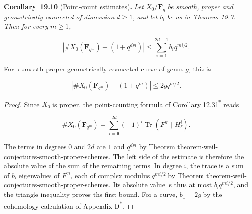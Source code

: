 \documentclass[11pt]{article}
\newenvironment{bpstatement}[2]{\par\addvspace{0.6\baselineskip}\noindent\textbf{#1}#2\textbf{.}\enspace\ignorespaces}
  {\par\addvspace{0.4\baselineskip}}
\newenvironment{bpstatementit}[2]{\begin{bpstatement}{#1}{#2}\itshape\ignorespaces}{\end{bpstatement}}
\newcommand{\bpout}[1]{#1\textsuperscript{\hyperlink{bp-outside}{\ensuremath{\ast}}}}
\begin{document}
\label{bp30}%
\begin{bpstatementit}{Corollary~19.10}{ (Point-count estimates)}
Let \(X_0/\mathbf F_q\) be smooth, proper and geometrically connected of dimension \(d\geq1\), and let \(b_i\) be as in Theorem \hyperref[bp24]{19.7}. Then for every \(m\geq1\),

\[
\left|\#X_0(\mathbf F_{q^m})-(1+q^{dm})\right|
\leq\sum_{i=1}^{2d-1}b_iq^{mi/2}.
\]

For a smooth proper geometrically connected curve of genus \(g\), this is

\[
\left|\#X_0(\mathbf F_{q^m})-(1+q^m)\right|
\leq 2gq^{m/2}.
\]
\end{bpstatementit}

\begin{proof}[{Proof}]\label{bp31}%
Since \(X_0\) is proper, the point-counting formula of Corollary \bpout{12.31} reads

\[
\#X_0(\mathbf F_{q^m})
=\sum_{i=0}^{2d}(-1)^i\operatorname{Tr}(F^m\mid H^i_\ell).
\]

The terms in degrees \(0\) and \(2d\) are \(1\) and \(q^{dm}\) by Theorem theorem-weil-conjectures-smooth-proper-schemes. The left side of the estimate is therefore the absolute value of the sum of the remaining terms. In degree \(i\), the trace is a sum of \(b_i\) eigenvalues of \(F^m\), each of complex modulus \(q^{mi/2}\) by Theorem theorem-weil-conjectures-smooth-proper-schemes. Its absolute value is thus at most \(b_iq^{mi/2}\), and the triangle inequality proves the first bound. For a curve, \(b_1=2g\) by the cohomology calculation of Appendix \bpout{D}.
\end{proof}



\clearpage{}\hypertarget{bp-outside}{}%
\end{document}
